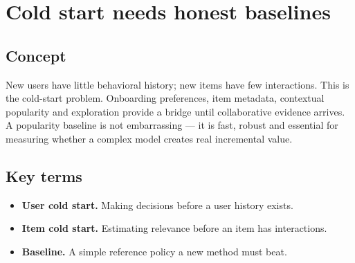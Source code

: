 \section{Cold start needs honest baselines}

\begin{abstract}
When history is missing, simple context and popularity are often the strongest first system.
\end{abstract}

\subsection{Concept}
New users have little behavioral history; new items have few interactions. This is the cold-start problem. Onboarding preferences, item metadata, contextual popularity and exploration provide a bridge until collaborative evidence arrives. A popularity baseline is not embarrassing — it is fast, robust and essential for measuring whether a complex model creates real incremental value.

\subsection{Key terms}
\begin{itemize}
\item \textbf{User cold start.} Making decisions before a user history exists.
\item \textbf{Item cold start.} Estimating relevance before an item has interactions.
\item \textbf{Baseline.} A simple reference policy a new method must beat.
\end{itemize}
